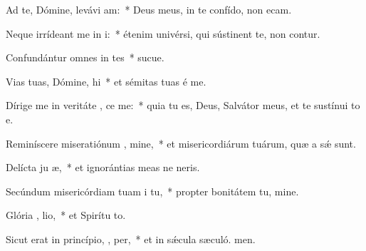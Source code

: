 \item Ad te, Dómine, levávi  am:~* Deus meus, in te confído, non ecam.
\item Neque irrídeant me in i:~* étenim univérsi, qui sústinent te, non contur.
\item Confundántur omnes in tes~* sucue.
\item Vias tuas, Dómine,  hi~* et sémitas tuas é me.
\item Dírige me in veritáte ,  ce me:~* quia tu es, Deus, Salvátor meus, et te sustínui to e.
\item Reminíscere miseratiónum , mine,~* et misericordiárum tuárum, quæ a sǽ sunt.
\item Delícta ju æ,~* et ignorántias meas ne neris.
\item Secúndum misericórdiam tuam  i tu,~* propter bonitátem tu, mine.
\item Glória ,  lio,~* et Spirítu to.
\item Sicut erat in princípio,  ,  per,~* et in sǽcula sæculó. men.
